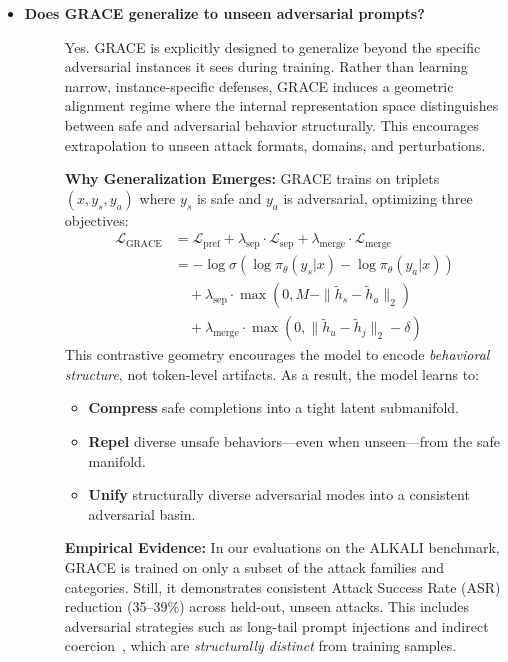 \begin{itemize}[leftmargin=15pt,nolistsep]
\item[\ding{93}] { \selectfont \textbf{Does GRACE generalize to unseen adversarial prompts?}}
\begin{description}
\item[]
Yes. GRACE is explicitly designed to generalize beyond the specific adversarial instances it sees during training. Rather than learning narrow, instance-specific defenses, GRACE induces a geometric alignment regime where the internal representation space distinguishes between safe and adversarial behavior structurally. This encourages extrapolation to unseen attack formats, domains, and perturbations.

\medskip
\textbf{Why Generalization Emerges:}
GRACE trains on triplets \((x, y_s, y_a)\) where \(y_s\) is safe and \(y_a\) is adversarial, optimizing three objectives:
\begin{align*}
\mathcal{L}_{\text{GRACE}} &= \mathcal{L}_{\text{pref}} + \lambda_{\text{sep}} \cdot \mathcal{L}_{\text{sep}} + \lambda_{\text{merge}} \cdot \mathcal{L}_{\text{merge}} \\
&= -\log \sigma\left( \log \pi_\theta(y_s|x) - \log \pi_\theta(y_a|x) \right) \\
&\quad + \lambda_{\text{sep}} \cdot \max(0, M - \|\tilde{h}_s - \tilde{h}_a\|_2) \\
&\quad + \lambda_{\text{merge}} \cdot \max(0, \|\tilde{h}_u - \tilde{h}_j\|_2 - \delta)
\end{align*}
This contrastive geometry encourages the model to encode \emph{behavioral structure}, not token-level artifacts. As a result, the model learns to:
\begin{itemize}
    \item \textbf{Compress} safe completions into a tight latent submanifold.
    \item \textbf{Repel} diverse unsafe behaviors—even when unseen—from the safe manifold.
    \item \textbf{Unify} structurally diverse adversarial modes into a consistent adversarial basin.
\end{itemize}


\medskip
\textbf{Empirical Evidence:} 
In our evaluations on the ALKALI benchmark, GRACE is trained on only a subset of the attack families and categories. Still, it demonstrates consistent Attack Success Rate (ASR) reduction (35--39\%) across held-out, unseen attacks. This includes adversarial strategies such as long-tail prompt injections and indirect coercion~\citep{greshake2023indirect, zhu2024promptbench}, which are \emph{structurally distinct} from training samples.


\end{description}
\end{itemize}
